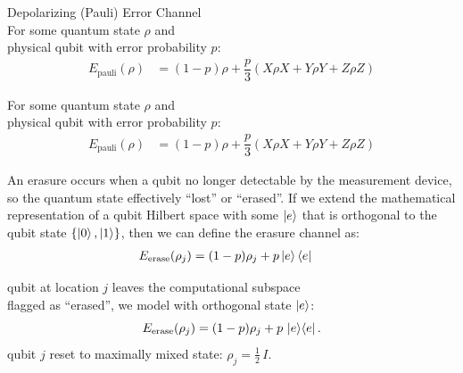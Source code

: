 \documentclass[11pt, notitlepage, letterpaper]{article}
\begin{document}
\centering Depolarizing (Pauli) Error Channel
\\ \noindent For some quantum state $\rho$ and
\\ \noindent physical qubit with error probability $p$:
\begin{align}E_{\text{pauli}}(\rho) & = (1-p)\rho + \dfrac{p}{3}(X\rho X + Y\rho Y + Z\rho Z)
\end{align}


\centering
\noindent For some quantum state $\rho$ and
\\ \noindent physical qubit with error probability $p$:
\begin{align}E_{\text{pauli}}(\rho) & = (1-p)\rho + \dfrac{p}{3}(X\rho X + Y\rho Y + Z\rho Z)
\end{align}

An erasure occurs when a qubit no longer detectable by the measurement device, so the quantum state effectively ``lost'' or ``erased''. If we extend the mathematical representation of a qubit Hilbert space with some $\ket{e}$ that is orthogonal to the qubit state $\{\ket{0}, \ket{1}\}$, then we can define the erasure channel as:
\begin{align}E_{\text{erase}}(\rho_j) & = (1-p)\rho_j + p\ket{e}\bra{e}
\end{align}


\noindent qubit at location $j$ leaves the computational subspace \\ flagged as
``erased'', we model with orthogonal state $\ket{e}$:
\[
    E_{\mathrm{erase}}(\rho_j) = (1-p)\rho_j + p\,\ket{e}\!\bra{e}.
\]
qubit $j$ reset to maximally mixed state:
$\rho_j = \tfrac{1}{2}\,I$.
\end{document}
